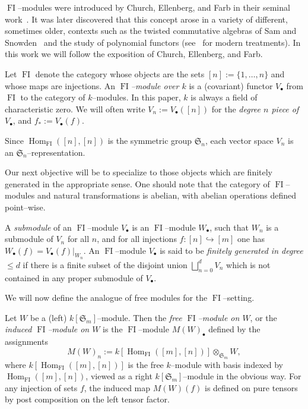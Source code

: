 \documentclass[ALCO,ThmDefs,Unicode,epreuves]{cedram}
\DeclareMathOperator{\FI}{FI}
\DeclareMathOperator{\Hom}{Hom}
\newcommand{\Sn}{\mathfrak{S}}
\newcommand{\as}{\text{*}}
\newcommand{\dt}{\bullet}
\begin{document}
$\FI$--modules were introduced by Church, Ellenberg, and Farb in their seminal work~\cite{CEF}. It was later discovered that this concept arose in a variety of different, sometimes older, contexts such as the twisted commutative algebras of Sam and Snowden~\cite{SS} and the study of polynomial functors (see~\cite{D,DV} for modern treatments). In this work we will follow the exposition of Church, Ellenberg, and Farb.

\begin{definition}
Let $\FI$ denote the category whose objects are the sets $[n] := \{1,\ldots,n\}$ and whose maps are injections. An \emph{$\FI$--module over $k$} is a (covariant) functor $V_\dt$ from $\FI$ to the category of $k$--modules. In this paper, $k$ is always a field of characteristic zero. We will often write $V_n := V_\dt([n])$ for the \emph{degree $n$ piece of $V_\dt$}, and $f_\as := V_\dt(f)$.
\end{definition}

Since $\Hom_{\FI}([n], [n])$ is the symmetric group $\Sn_n$, each vector space $V_n$ is an $\Sn_n$--representation.

Our next objective will be to specialize to those objects which are finitely generated in the appropriate sense. One should note that the category of $\FI$--modules and natural transformations is abelian, with abelian operations defined point--wise.

\begin{definition}\label{finitelygenerated}
A \emph{submodule} of an $\FI$--module $V_\dt$ is an $\FI$--module $W_\dt$, such that $W_n$ is a submodule of $V_n$ for all $n$, and for all injections $f:[n] \hookrightarrow [m]$ one has $W_\dt(f) = V_\dt(f)|_{W_n}$. An $\FI$--module $V_{\dt}$ is said to be \emph{finitely generated in degree $\leq d$} if there is a finite subset of the disjoint union $\bigsqcup_{n = 0}^d V_n$ which is not contained in any proper submodule of $V_{\dt}$.
\end{definition}

We will now define the analogue of free modules for the $\FI$--setting.

\begin{definition}
Let $W$ be a (left) $k[\Sn_m]$--module. Then the \emph{free $\FI$--module on $W$}, or the \emph{induced $\FI$--module on $W$} is the $\FI$--module $M(W)_\dt$ defined by the assignments
\[
M(W)_n := k[\Hom_{\FI}([m],[n])] \otimes_{\Sn_m} W,
\]
where $k[\Hom_{\FI}([m],[n])]$ is the free $k$--module with basis indexed by $\Hom_{\FI}([m],[n])$, viewed as a right $k[\Sn_m]$--module in the obvious way. For any injection of sets $f$, the induced map $M(W)(f)$ is defined on pure tensors by post composition on the left tensor factor.
\end{definition}
\end{document}
